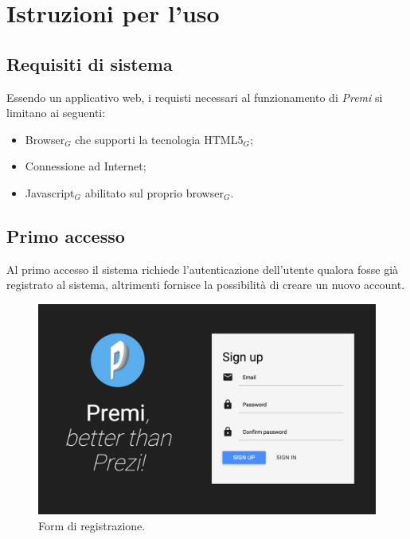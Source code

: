 \section{Istruzioni per l'uso}
\subsection{Requisiti di sistema}
Essendo un applicativo web, i requisti necessari al funzionamento di \emph{Premi} si limitano ai seguenti:
\begin{itemize}
\item Browser$_G$ che supporti la tecnologia HTML5$_G$;
\item Connessione ad Internet;
\item Javascript$_G$ abilitato sul proprio browser$_G$.
\end{itemize}

\subsection{Primo accesso}
Al primo accesso il sistema richiede l'autenticazione dell'utente qualora fosse già registrato al sistema, altrimenti fornisce la possibilità di creare un nuovo account.
\begin{figure}[h]
\begin{center}
\includegraphics[scale=0.4]{img/signup.png}
\caption{Form di registrazione.}
\end{center}
\end{figure}

